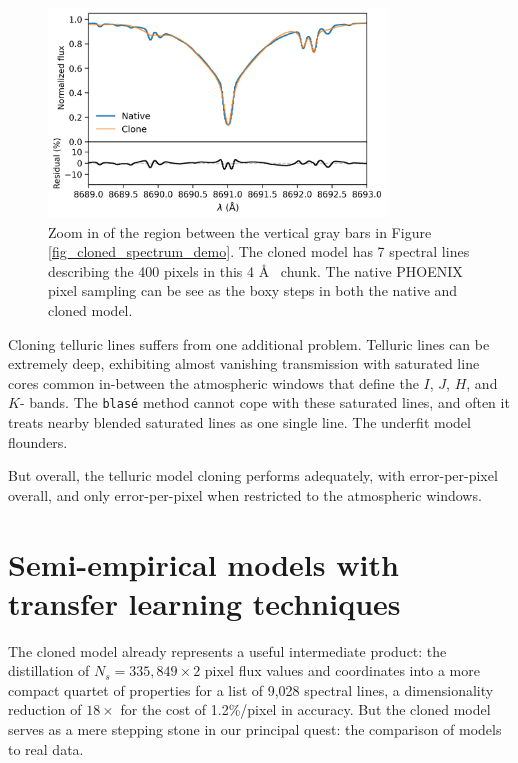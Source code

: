\documentclass[modern]{aastex631}
\begin{document}
\begin{figure}[hbt!]
    \centering
    \includegraphics[width=0.8\textwidth]{figures/blase_clone_demo_zoom.png}
    \caption{Zoom in of the region between the vertical gray bars in Figure \ref{fig_cloned_spectrum_demo}. The cloned model has 7 spectral lines describing the 400 pixels in this 4 \AA~ chunk.  The native PHOENIX pixel sampling can be see as the boxy steps in both the native and cloned model.  }
    \label{fig_zoom_cloning_performance}
\end{figure}

Cloning telluric lines suffers from one additional problem.  Telluric lines can be extremely deep, exhibiting almost vanishing transmission with saturated line cores common in-between the atmospheric windows that define the $I$, $J$, $H$, and $K$- bands.  The \texttt{blas\'e} method cannot cope with these saturated lines, and often it treats nearby blended saturated lines as one single line.  The underfit model flounders.

But overall, the telluric model cloning performs adequately, with  error-per-pixel overall, and only  error-per-pixel when restricted to the atmospheric windows.


\section{Semi-empirical models with transfer learning techniques}\label{transferLearn}


The cloned model already represents a useful intermediate product: the distillation of $N_s=335,849\times2$ pixel flux values and coordinates into a more compact quartet of properties for a list of 9,028 spectral lines, a dimensionality reduction of $18\times$ for the cost of 1.2\%/pixel in accuracy.  But the cloned model serves as a mere stepping stone in our principal quest: the comparison of models to real data.
\end{document}
